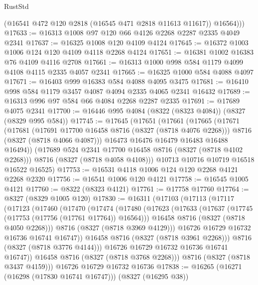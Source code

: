 \begin{lexlean}{RustStd}
\begin{coremodule}
{\begin{coremodule}
{{{{{{{{{{{{{{{{{{{{{{{{{{{{{{{{{{{{{{{{{{{{{{{{{{{{{{          (@16541 @472 @120 @2818 (@16545 @471 @2818 @11613 @11617))
          @16564)))
@17633 := @16313 @1008 @97 @120 @66 @4126 @2268 @2287 @2335 @4049 @2341
@17637 := @16325 @1008 @120 @4109 @4124
@17645 := @16372 @1003 @1006 @124 @120 @4109 @4118 @2268 @4124
@17651 := @16381 @1002 @16383 @76 @4109 @4116 @2708
@17661 := @16313 @1000 @998 @584 @1179 @4099 @4108 @4115 @2335 @4057 @2341
@17665 := @16325 @1000 @584 @4088 @4097
@17671 := @16403 @999 @16383 @584 @4088 @4095 @3475
@17681 := @16410 @998 @584 @1179 @3457 @4087 @4094 @2335 @4065 @2341 @16432
@17689 := @16313 @996 @97 @584 @66 @4084 @2268 @2287 @2335
@17691 := @17689 @4075 @2341
@17700 := @16446 @995 @4084 (@8322 (@8323 @4084)) (@8327 (@8329 @995 @584))
@17745 := @17645
    (@17651
      (@17661
        (@17665
          (@17671
            (@17681
              (@17691 @17700 @16458 @8716 (@8327 (@8718 @4076 @2268)))
              @8716
              (@8327 (@8718 @4066 @4087)))
            @16473
            @16476
            @16479
            @16483
            @16488
            @16494))
        (@17689 @524 @2341 @17700 @16458 @8716 (@8327 (@8718 @4102 @2268)))
        @8716
        (@8327 (@8718 @4058 @4108)))
      @10713
      @10716
      @10719
      @16518
      @16522
      @16525)
@17753 := @16531 @4118 @1006 @124 @120 @2268 @4121 @2268 @2320
@17756 := @16541 @1006 @120 @4121
@17758 := @16545 @1005 @4121
@17760 := @8322 (@8323 @4121)
@17761 := @17758 @17760
@17764 := @8327 (@8329 @1005 @120)
@17830 := @16311
    (@17103
      (@17113
        (@17117
          (@17123
            (@17460
              (@17470
                (@17474
                  (@17480
                    (@17623
                      (@17633
                        (@17637 (@17745 (@17753 (@17756 (@17761 @17764)) @16564)))
                        @16458
                        @8716
                        (@8327 (@8718 @4050 @2268)))
                      @8716
                      (@8327 (@8718 @3969 @4129)))
                    @16726
                    @16729
                    @16732
                    @16736
                    @16741
                    @16747))
                @16458
                @8716
                (@8327 (@8718 @3961 @2268)))
              @8716
              (@8327 (@8718 @3776 @4144)))
            @16726
            @16729
            @16732
            @16736
            @16741
            @16747))
        @16458
        @8716
        (@8327 (@8718 @3768 @2268)))
      @8716
      (@8327 (@8718 @3437 @4159)))
    @16726
    @16729
    @16732
    @16736
@17838 := @16265 (@16271 (@16298 (@17830 @16741 @16747))) (@8327 (@16295 @38))
}}}}}}}}}}}}}}}}}}}}}}}}}}}}}}}}}}}}}}}}}}}}}}}}}}}}}}
\end{coremodule}}
\end{coremodule}
\end{lexlean}
